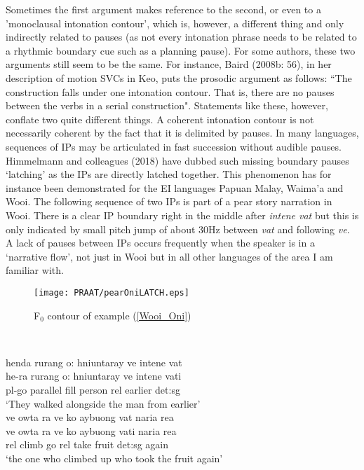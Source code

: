 Sometimes the first argument makes reference to the second, or even to a 'monoclausal intonation contour', which is, however, a different thing and only indirectly related to pauses (as not every intonation phrase needs to be related to a rhythmic boundary cue such as a planning pause). For some authors, these two arguments still seem to be the same. For instance, Baird (2008b: 56), in her description of motion SVCs in Keo, puts the prosodic argument as follows: ``The construction falls under one intonation contour. That is, there are no pauses between the verbs in a serial construction". Statements like these, however, conflate two quite different things. A coherent intonation contour is not necessarily coherent by the fact that it is delimited by pauses. In many languages, sequences of IPs may be articulated in fast succession without audible pauses. Himmelmann and colleagues (2018) have dubbed such missing boundary pauses `latching' as the IPs are directly latched together. This phenomenon has for instance been demonstrated for the EI languages Papuan Malay, Waima'a and Wooi. The following sequence of two IPs is part of a pear story narration in Wooi. There is a clear IP boundary right in the middle after \textit{intene vat} but this is only indicated by small pitch jump of about 30Hz between \textit{vat} and following \textit{ve}. A lack of pauses between IPs occurs frequently when the speaker is in a `narrative flow', not just in Wooi but in all other languages of the area I am familiar with.

\begin{figure}

\texttt{[image: PRAAT/pearOniLATCH.eps]} 
\caption{F$_0$ contour of example (\ref{Wooi_Oni})}\label{fig:Wooi_Oni}

\end{figure}
\

\pex \label{Wooi_Oni}
\a
\gll henda rurang o: hniuntaray ve intene vat \\
he-ra rurang o: hniuntaray ve intene vati \\
\acs{pl}-go parallel \acs{fill} person \acs{rel} earlier \acs{det}:\acs{sg} \\
\glft `They walked alongside the man from earlier' \\ 
\z
\a
\gla ve owta ra ve ko aybuong vat naria rea \\ 
ve owta ra ve ko aybuong vati naria rea \\
\glc \acs{rel} climb go \acs{rel} take fruit \acs{det}:\acs{sg} again  \\
\glft `the one who climbed up who took the fruit again' \\ 
\z
\xe

